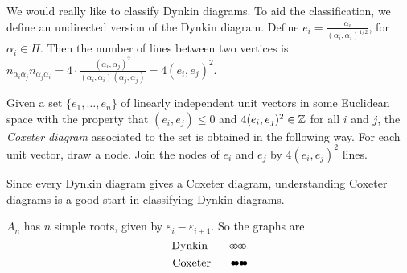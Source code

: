  We would really like to classify Dynkin diagrams. To aid the classification, we
 define an undirected version of the Dynkin diagram. Define $e_i =
 \frac{\alpha_i}{(\alpha_i,\alpha_i)^{1/2}}$, for $\alpha_i\in \Pi$. Then the number
 of lines between two vertices is $n_{\alpha_i\alpha_j}n_{\alpha_j\alpha_i} = 4\cdot
 \frac{(\alpha_i,\alpha_j)^2}{(\alpha_i,\alpha_i)(\alpha_j,\alpha_j)} = 4(e_i,e_j)^2$.
 \begin{definition}
   Given a set $\{e_1,\dots, e_n\}$ of linearly independent unit vectors in some
   Euclidean space with the property that $(e_i,e_j)\le 0$ and $4(e_i,e_j)^2\in \mathbb{Z}$
   for all $i$ and $j$, the \emph{Coxeter diagram}
   associated to the set is obtained in the following way. For each unit vector, draw
   a node. Join the nodes of $e_i$ and $e_j$ by $4(e_i,e_j)^2$ lines.
 \end{definition}
 Since every Dynkin diagram gives a Coxeter diagram, understanding Coxeter diagrams is
 a good start in classifying Dynkin diagrams.

 \begin{example}
   $A_n$ has $n$ simple roots, given by $\varepsilon_i - \varepsilon_{i+1}$. So the
   graphs are
 \[\text{Dynkin}\qquad \begin{xy}
   (0,0) *\cir<2pt>{};
   (1,0)  *\cir<2pt>{} **@{-};
   p+(.5,0) **@{-};
   p+(.6,0) **{\hspace{1pt}.\hspace{1pt}};
   p+(.5,0)  *\cir<2pt>{} **@{-};
   p+(1,0)  *\cir<2pt>{} **@{-};
 \end{xy} \]
\[\text{Coxeter}\qquad \begin{xy}
   (0,0) *=<0pt>{\bullet};
   (1,0)  *=<0pt>{\bullet} **@{-};
   p+(.5,0) **@{-};
   p+(.6,0) **{\hspace{1pt}.\hspace{1pt}};
   p+(.5,0)  *=<0pt>{\bullet} **@{-};
   p+(1,0)  *=<0pt>{\bullet} **@{-};
 \end{xy} \]
 \end{example}

